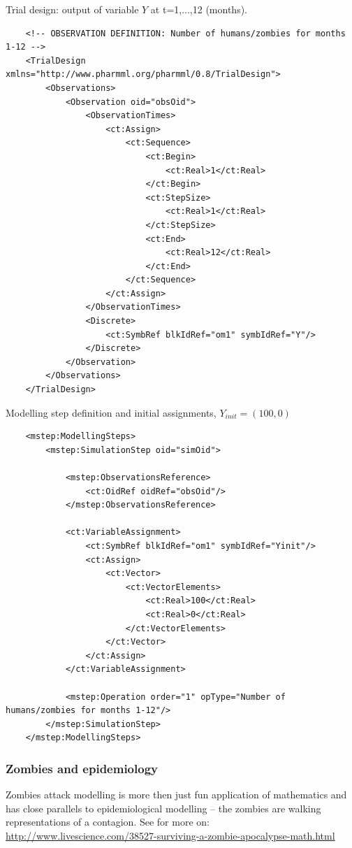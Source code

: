 Trial design: output of variable $Y$ at t=1,...,12 (months).
\lstset{language=XML}
\begin{lstlisting}
    <!-- OBSERVATION DEFINITION: Number of humans/zombies for months 1-12 -->
    <TrialDesign xmlns="http://www.pharmml.org/pharmml/0.8/TrialDesign">
        <Observations>
            <Observation oid="obsOid">
                <ObservationTimes>
                    <ct:Assign>
                        <ct:Sequence>
                            <ct:Begin>
                                <ct:Real>1</ct:Real>
                            </ct:Begin>
                            <ct:StepSize>
                                <ct:Real>1</ct:Real>
                            </ct:StepSize>
                            <ct:End>
                                <ct:Real>12</ct:Real>
                            </ct:End>
                        </ct:Sequence>
                    </ct:Assign>
                </ObservationTimes>
                <Discrete>
                    <ct:SymbRef blkIdRef="om1" symbIdRef="Y"/>
                </Discrete>
            </Observation>
        </Observations>
    </TrialDesign>
\end{lstlisting}
Modelling step definition and initial assignments, $Y_{init} = (100, 0)$
\lstset{language=XML}
\begin{lstlisting}
    <mstep:ModellingSteps>
        <mstep:SimulationStep oid="simOid">
            
            <mstep:ObservationsReference>
                <ct:OidRef oidRef="obsOid"/>
            </mstep:ObservationsReference>
            
            <ct:VariableAssignment>
                <ct:SymbRef blkIdRef="om1" symbIdRef="Yinit"/>
                <ct:Assign>
                    <ct:Vector>
                        <ct:VectorElements>
                            <ct:Real>100</ct:Real>
                            <ct:Real>0</ct:Real>
                        </ct:VectorElements>
                    </ct:Vector>
                </ct:Assign>
            </ct:VariableAssignment>
            
            <mstep:Operation order="1" opType="Number of humans/zombies for months 1-12"/>
        </mstep:SimulationStep>
    </mstep:ModellingSteps>
\end{lstlisting}


\subsubsection{Zombies and epidemiology}
Zombies attack modelling is more then just fun application of mathematics and
has close parallels to epidemiological modelling -- the zombies are walking 
representations of a contagion. 
See for more on: \url{http://www.livescience.com/38527-surviving-a-zombie-apocalypse-math.html}


